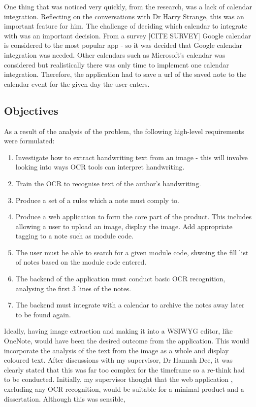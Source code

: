 One thing that was noticed very quickly, from the research, was a lack of calendar integration. Reflecting on the conversations with Dr Harry Strange, this was an important feature for him. The challenge of deciding which calendar to integrate with was an important decision. From a survey [CITE SURVEY] Google calendar is considered to the most popular app - so it was decided that Google calendar integration was needed. Other calendars such as Microsoft's calendar was considered but realistically there was only time to implement one calendar integration. Therefore, the application had to save a url of the saved note to the calendar event for the given day the user enters.

\subsection{Objectives}
As a result of the analysis of the problem, the following high-level requirements were formulated:
\begin{enumerate}
	\item Investigate how to extract handwriting text from an image - this will involve looking into ways OCR tools can interpret handwriting. 
	\item Train the OCR to recognise text of the author's handwriting.
	\item Produce a set of a rules which a note must comply to.
	\item Produce a web application to form the core part of the product. This includes allowing a user to upload an image, display the image. Add appropriate tagging to a note such as module code. 
	\item The user must be able to search for a given module code, shwoing the fill list of notes based on the module code entered.
	\item The backend of the application must conduct basic OCR recognition, analysing the first 3 lines of the notes. 
	\item The backend must integrate with a calendar to archive the notes away later to be found again.
\end{enumerate}

Ideally, having image extraction and making it into a WSIWYG editor, like OneNote, would have been the desired outcome from the application. This would incorporate the analysis of the text from the image as a whole and display coloured text. After discussions with my supervisor, Dr Hannah Dee, it was clearly stated that this was far too complex for the timeframe so a re-think had to be conducted. Initially, my supervisor thought that the web application , excluding any OCR recognition, would be suitable for a minimal product and a dissertation. Although this was sensible, 

